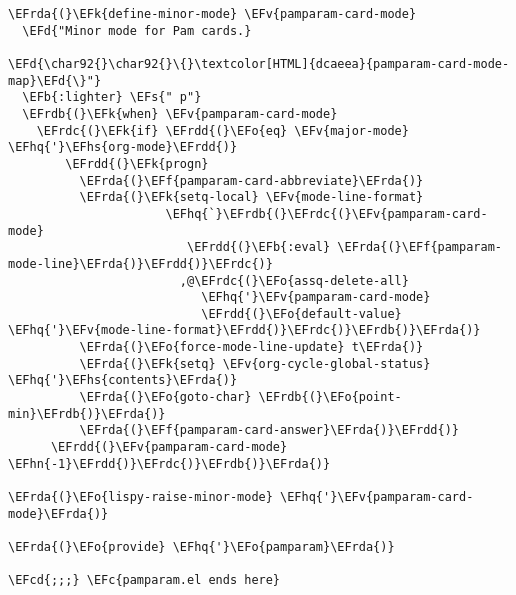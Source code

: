 \documentclass[a4wide,10pt]{article}
\newcommand{\EFc}[1]{\textcolor{EFc}{#1}} %
\newcommand{\EFcd}[1]{\textcolor{EFcd}{#1}} %
\newcommand{\EFs}[1]{\textcolor{EFs}{#1}} %
\newcommand{\EFd}[1]{\textcolor{EFd}{#1}} %
\newcommand{\EFk}[1]{\textcolor{EFk}{#1}} %
\newcommand{\EFb}[1]{\textcolor{EFb}{#1}} %
\newcommand{\EFf}[1]{\textcolor{EFf}{#1}} %
\newcommand{\EFv}[1]{\textcolor{EFv}{#1}} %
\newcommand{\EFo}[1]{\textcolor{EFo}{#1}} %
\newcommand{\EFhn}[1]{\textcolor{EFhn}{\textbf{#1}}} %
\newcommand{\EFhq}[1]{\textcolor{EFhq}{#1}} %
\newcommand{\EFhs}[1]{\textcolor{EFhs}{#1}} %
\newcommand{\EFrda}[1]{\textcolor{EFrda}{#1}} %
\newcommand{\EFrdb}[1]{\textcolor{EFrdb}{#1}} %
\newcommand{\EFrdc}[1]{\textcolor{EFrdc}{#1}} %
\newcommand{\EFrdd}[1]{\textcolor{EFrdd}{#1}} %
\begin{document}
\begin{Code}
\begin{Verbatim}
\EFrda{(}\EFk{define-minor-mode} \EFv{pamparam-card-mode}
  \EFd{"Minor mode for Pam cards.}

\EFd{\char92{}\char92{}\{}\textcolor[HTML]{dcaeea}{pamparam-card-mode-map}\EFd{\}"}
  \EFb{:lighter} \EFs{" p"}
  \EFrdb{(}\EFk{when} \EFv{pamparam-card-mode}
    \EFrdc{(}\EFk{if} \EFrdd{(}\EFo{eq} \EFv{major-mode} \EFhq{'}\EFhs{org-mode}\EFrdd{)}
        \EFrdd{(}\EFk{progn}
          \EFrda{(}\EFf{pamparam-card-abbreviate}\EFrda{)}
          \EFrda{(}\EFk{setq-local} \EFv{mode-line-format}
                      \EFhq{`}\EFrdb{(}\EFrdc{(}\EFv{pamparam-card-mode}
                         \EFrdd{(}\EFb{:eval} \EFrda{(}\EFf{pamparam-mode-line}\EFrda{)}\EFrdd{)}\EFrdc{)}
                        ,@\EFrdc{(}\EFo{assq-delete-all}
                           \EFhq{'}\EFv{pamparam-card-mode}
                           \EFrdd{(}\EFo{default-value} \EFhq{'}\EFv{mode-line-format}\EFrdd{)}\EFrdc{)}\EFrdb{)}\EFrda{)}
          \EFrda{(}\EFo{force-mode-line-update} t\EFrda{)}
          \EFrda{(}\EFk{setq} \EFv{org-cycle-global-status} \EFhq{'}\EFhs{contents}\EFrda{)}
          \EFrda{(}\EFo{goto-char} \EFrdb{(}\EFo{point-min}\EFrdb{)}\EFrda{)}
          \EFrda{(}\EFf{pamparam-card-answer}\EFrda{)}\EFrdd{)}
      \EFrdd{(}\EFv{pamparam-card-mode} \EFhn{-1}\EFrdd{)}\EFrdc{)}\EFrdb{)}\EFrda{)}

\EFrda{(}\EFo{lispy-raise-minor-mode} \EFhq{'}\EFv{pamparam-card-mode}\EFrda{)}

\EFrda{(}\EFo{provide} \EFhq{'}\EFo{pamparam}\EFrda{)}

\EFcd{;;;} \EFc{pamparam.el ends here}

\end{Verbatim}
\end{Code}
\end{document}
